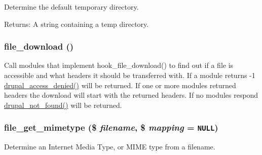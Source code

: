 Determine the default temporary directory.

\begin{Desc}
\item[Returns:]A string containing a temp directory. \end{Desc}
\hypertarget{group__file_g91226299fab7e95a673f6461bbc19b02}{
\subsubsection[{file\_\-download}]{\setlength{\rightskip}{0pt plus 5cm}file\_\-download ()}}
\label{group__file_g91226299fab7e95a673f6461bbc19b02}


Call modules that implement hook\_\-file\_\-download() to find out if a file is accessible and what headers it should be transferred with. If a module returns -1 \hyperlink{common_8inc_0bbff371f9373002e71f2e1347fcf481}{drupal\_\-access\_\-denied()} will be returned. If one or more modules returned headers the download will start with the returned headers. If no modules respond \hyperlink{common_8inc_52b08cd98e1756326c1bd5b56c39a884}{drupal\_\-not\_\-found()} will be returned. \hypertarget{group__file_g27868c5159f7f001457c284123fe9311}{
\subsubsection[{file\_\-get\_\-mimetype}]{\setlength{\rightskip}{0pt plus 5cm}file\_\-get\_\-mimetype (\$ {\em filename}, \/  \$ {\em mapping} = {\tt NULL})}}
\label{group__file_g27868c5159f7f001457c284123fe9311}


Determine an Internet Media Type, or MIME type from a filename.

